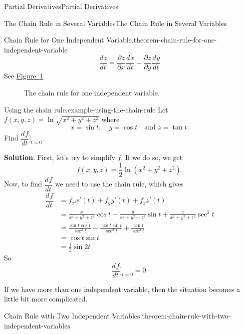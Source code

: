 \documentclass[10pt,]{book}
\numberwithin{equation}{section}
\newcommand{\dv}[3][]{\dfrac{d^{#1} #2}{d #3^{#1}}}
\newcommand{\pdv}[3][]{\dfrac{\partial^{#1} #2}{\partial #3^{#1}}}
\begin{document}
\begin{chapterptx}{Partial Derivatives}{}{Partial Derivatives}{}{}
\begin{sectionptx}{The Chain Rule in Several Variables}{}{The Chain Rule in Several Variables}{}{}
\begin{theorem}{Chain Rule for One Independent Variable.}{}{theorem-chain-rule-for-one-independent-variable}
\begin{equation*}
\dv{z}{t} = \pdv{z}{x}\dv{x}{t} + \pdv{z}{y}\dv{y}{t}
\end{equation*}
See \hyperref[figure-chain-rule-one-independent-variable]{Figure~\ref{figure-chain-rule-one-independent-variable}}.%
\end{theorem}
\begin{figure}
\centering
{
}
\caption{The chain rule for one independent variable.\label{figure-chain-rule-one-independent-variable}}
\end{figure}
\begin{example}{Using the chain rule.}{example-using-the-chain-rule}%
\hypertarget{p-1169}{}%
Let \(f(x,y,z) = \ln\sqrt{x^{2}+y^{2}+z^{2}}\) where%
\begin{equation*}
x = \sin t,\quad y = \cos t\quad\text{and } z = \tan t.
\end{equation*}
Find \(\dv{f}{t}\bigg]_{t=0}\).%
\par\smallskip%
\noindent\textbf{Solution}.\hypertarget{solution-182}{}\quad%
\hypertarget{p-1170}{}%
First, let's try to simplify \(f\). If we do so, we get%
\begin{equation*}
f(x,y,z) = \frac{1}{2}\ln(x^{2} + y^{2} + z^{2}).
\end{equation*}
Now, to find \(\dv{f}{t}\) we need to use the chain rule, which gives%
\begin{align*}
\dv{f}{t} & = f_{x}x'(t) + f_{y}y'(t) + f_{z}z'(t) \\
& = \frac{x}{x^{2} + y^{2} + z^{2}}\cos t  - \frac{y}{x^{2} + y^{2} + z^{2}}\sin t + \frac{z}{x^{2} + y^{2} + z^{2}}\sec^{2}t\\
& = \frac{\sin t\cos t}{\sec^{2}t} - \frac{\cos t\sin t}{\sec^{2}t} + \frac{\tan t}{\sec^{2}t}\\
& = \cos t\sin t \\
& = \frac{1}{2}\sin2t 
\end{align*}
So%
\begin{equation*}
\dv{f}{t}\bigg]_{t=0} = 0.
\end{equation*}
%
\end{example}
\hypertarget{p-1171}{}%
If we have more than one independent variable, then the situation becomes a little bit more complicated.%
\begin{theorem}{Chain Rule with Two Independent Variables.}{}{theorem-chain-rule-with-two-independent-variables}%

\end{theorem}
\end{sectionptx}
\end{chapterptx}
\end{document}
